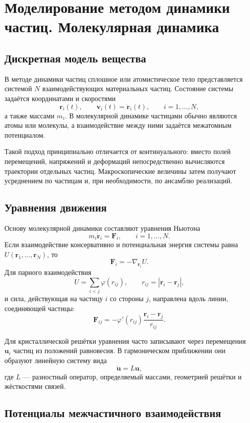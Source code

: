 \section{Моделирование методом динамики частиц. Молекулярная динамика}
\label{sec:particle-molecular-dynamics}

\subsection{Дискретная модель вещества}

В методе динамики частиц сплошное или атомистическое тело представляется
системой $N$ взаимодействующих материальных частиц. Состояние системы задаётся
координатами и скоростями
\[
    \mathbf r_i(t),\qquad \mathbf v_i(t)=\dot{\mathbf r}_i(t),
    \qquad i=1,\ldots,N,
\]
а также массами $m_i$. В молекулярной динамике частицами обычно являются атомы
или молекулы, а взаимодействие между ними задаётся межатомным потенциалом.

Такой подход принципиально отличается от континуального: вместо полей
перемещений, напряжений и деформаций непосредственно вычисляются траектории
отдельных частиц. Макроскопические величины затем получают усреднением по
частицам и, при необходимости, по ансамблю реализаций.

\subsection{Уравнения движения}

Основу молекулярной динамики составляют уравнения Ньютона
\[
    m_i\ddot{\mathbf r}_i=\mathbf F_i,
    \qquad i=1,\ldots,N.
\]
Если взаимодействие консервативно и потенциальная энергия системы равна
$U(\mathbf r_1,\ldots,\mathbf r_N)$, то
\[
    \mathbf F_i=-\nabla_{\mathbf r_i}U.
\]
Для парного взаимодействия
\[
    U=\sum_{i<j}\varphi(r_{ij}),
    \qquad
    r_{ij}=|\mathbf r_i-\mathbf r_j|,
\]
и сила, действующая на частицу $i$ со стороны $j$, направлена вдоль линии,
соединяющей частицы:
\[
    \mathbf F_{ij}
    =-\varphi'(r_{ij})
      \frac{\mathbf r_i-\mathbf r_j}{r_{ij}}.
\]

Для кристаллической решётки уравнения часто записывают через перемещения
$\mathbf u_i$ частиц из положений равновесия. В гармоническом приближении они
образуют линейную систему вида
\[
    \ddot{\mathbf u}=L\mathbf u,
\]
где $L$ --- разностный оператор, определяемый массами, геометрией решётки и
жёсткостями связей.

\subsection{Потенциалы межчастичного взаимодействия}

